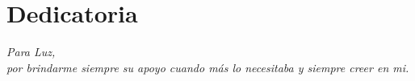 \chapter{Dedicatoria}

\begin{flushright}
\textit{Para Luz, \\ 
por brindarme siempre su apoyo cuando más lo necesitaba y siempre creer en mi.}
\end{flushright}

